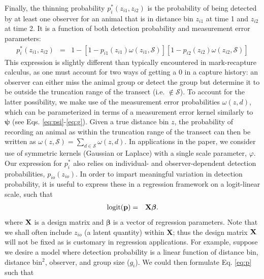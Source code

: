 \documentclass[aoas,preprint]{imsart}
\numberwithin{equation}{section}
\theoremstyle{plain}
\begin{document}
Finally, the thinning probability
$p_i^*(z_{i1},z_{i2})$ is the probability of being detected by at least one observer for an animal that is in distance bin $z_{i1}$ at time 1 and $z_{i2}$ at time 2. It is a function of both detection probability and measurement error parameters:
\begin{eqnarray*}
  \label{eq:pstar}
  p_i^*(z_{i1},z_{i2}) & = &
  1 - [1- p_{i1}(z_{i1}) \omega(z_{i1},\mathcal{S})][1-p_{i2}(z_{i2})\omega(z_{i2},\mathcal{S})]
\end{eqnarray*}
This expression is slightly different than typically encountered in mark-recapture calculus, as one must account for two ways of getting a 0 in a capture history: an observer can either miss the animal group or detect the group but determine it to be outside the truncation range of the transect (i.e. $\notin \mathcal{S}$).  To account for the latter possibility, we make use of the measurement error probabilities $\omega(z,d)$, which can be parameterized in terms of a measurement error kernel similarly to $\boldsymbol{\psi}$ (see Eqs. \ref{eq:psi}-\ref{eq:g}). Given a true distance bin $z$, the probability of recording an animal as within the truncation range of the transect can then be written as $\omega(z,\mathcal{S})=\sum_{d \in \mathcal{S}} \omega(z,d)$. In applications in the paper, we consider use of symmetric kernels (Gaussian or Laplace) with a single scale parameter, $\varphi$.  Our expression for $p_i^*$ also relies on individual- and observer-dependent detection probabilities, $p_{io}(z_{io})$.  In order to impart meaningful variation in detection probability, it is useful to express these in a regression framework on a logit-linear scale, such that
\begin{eqnarray}
  \textrm{logit}({\bf p}) & = & {\bf X} \boldsymbol{\beta}.
  \label{eq:p}
\end{eqnarray}
where ${\bf X}$ is a design matrix and $\boldsymbol{\beta}$ is a vector of regression parameters.
Note that we shall often include $z_{io}$ (a latent quantity) within \textbf{X}; thus  the design matrix ${\bf X}$ will not be fixed as is customary in regression applications.  For example, suppose we desire a model where detection probability is a linear function of distance bin, distance bin$^2$, observer, and group size ($g_i$).  We could then formulate Eq. \ref{eq:p} such that
\end{document}
